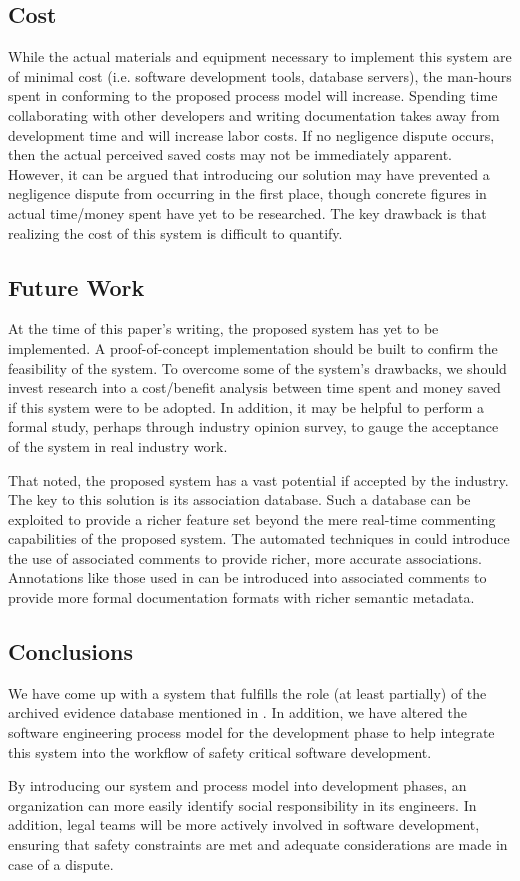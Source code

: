 \subsection*{Cost}
While the actual materials and equipment necessary to implement this system are
of minimal cost (i.e. software development tools, database servers), the
man-hours spent in conforming to the proposed process model will increase.
Spending time collaborating with other developers and writing documentation
takes away from development time and will increase labor costs. If no negligence
dispute occurs, then the actual perceived saved costs may not be immediately
apparent. However, it can be argued that introducing our solution may have
prevented a negligence dispute from occurring in the first place, though 
concrete figures in actual time/money spent have yet to be researched. The key
drawback is that realizing the cost of this system is difficult to quantify.

\subsection{Future Work}
At the time of this paper's writing, the proposed system has yet to be
implemented. A proof-of-concept implementation should be built to confirm the
feasibility of the system. To overcome some of the system's drawbacks, we should
invest research into a cost/benefit analysis between time spent and money saved
if this system were to be adopted. In addition, it may be helpful to perform a
formal study, perhaps through industry opinion survey, to gauge the acceptance
of the system in real industry work.

That noted, the proposed system has a vast potential if accepted by the
industry. The key to this solution is its association database. Such a database
can be exploited to provide a richer feature set beyond the mere real-time
commenting capabilities of the proposed system. The automated techniques in 
\cite{Antoniol1999, Antoniol2000} could introduce the use of associated comments
to provide richer, more accurate associations. Annotations like those used in
\cite{Javadoc} can be introduced into associated comments to provide more formal
documentation formats with richer semantic metadata.

\subsection{Conclusions}
We have come up with a system that fulfills the role (at least partially) of the
archived evidence database mentioned in \cite{Turner2001}. In addition, we have
altered the software engineering process model for the development phase to help
integrate this system into the workflow of safety critical software development.

By introducing our system and process model into development phases, an
organization can more easily identify social responsibility in its engineers. In
addition, legal teams will be more actively involved in software development,
ensuring that safety constraints are met and adequate considerations are made in
case of a dispute.
